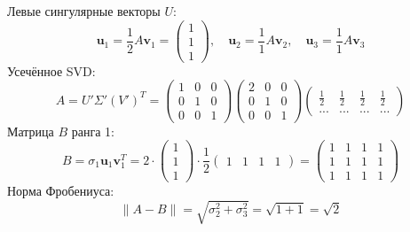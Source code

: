 \documentclass[a4paper]{article}
\begin{document}
\begin{enumerate}
\begin{enumerate}
  Левые сингулярные векторы \( U \):  
  \[
  \mathbf{u}_1 = \frac{1}{2} A \mathbf{v}_1 = 
  \begin{pmatrix} 1 \\ 1 \\ 1 \end{pmatrix}, \quad \mathbf{u}_2 =
   \frac{1}{1} A \mathbf{v}_2, \quad \mathbf{u}_3 = \frac{1}{1} A \mathbf{v}_3
  \]
  Усечённое SVD:
  \[
  A = U' \Sigma' (V')^T = \begin{pmatrix}
  1 & 0 & 0 \\
  0 & 1 & 0 \\
  0 & 0 & 1
  \end{pmatrix} \begin{pmatrix}
  2 & 0 & 0 \\
  0 & 1 & 0 \\
  0 & 0 & 1
  \end{pmatrix} \begin{pmatrix}
  \frac{1}{2} & \frac{1}{2} & \frac{1}{2} & \frac{1}{2} \\
  \text{...} & \text{...} & \text{...} & \text{...}
  \end{pmatrix}
  \]
  Матрица \( B \) ранга 1:
  \[
  B = \sigma_1 \mathbf{u}_1 \mathbf{v}_1^T = 2 \cdot
   \begin{pmatrix} 1 \\ 1 \\ 1 \end{pmatrix} \cdot \frac{1}{2}
    \begin{pmatrix} 1 & 1 & 1 & 1 \end{pmatrix} = \begin{pmatrix}
  1 & 1 & 1 & 1 \\
  1 & 1 & 1 & 1 \\
  1 & 1 & 1 & 1
  \end{pmatrix}
  \]  
  Норма Фробениуса:  
  \[
  \|A - B\| = \sqrt{\sigma_2^2 + \sigma_3^2} = \sqrt{1 + 1} = \sqrt{2}
  \]
  \end{enumerate}


\end{enumerate}
\end{document}
